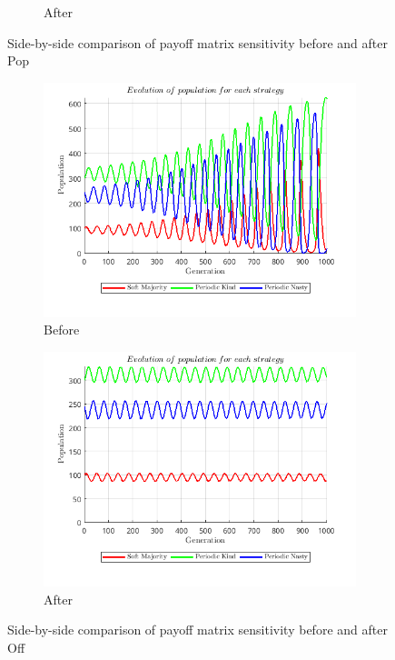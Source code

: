 \documentclass[12pt]{report}
\begin{document}
\begin{figure}[H]
\begin{subfigure}[t]{0.45\textwidth}
        \caption{After}
    \end{subfigure}
    \caption{Side-by-side comparison of payoff matrix sensitivity before and after Pop}
\end{figure}

\begin{figure}[H]
    \centering
    \begin{subfigure}[t]{0.45\textwidth}
        \centering
        \includegraphics[width=\textwidth]{payoff_matrix_sensitivity_before_off.png}
        \caption{Before}
    \end{subfigure}
    \hfill
    \begin{subfigure}[t]{0.45\textwidth}
        \centering
        \includegraphics[width=\textwidth]{payoff_matrix_sensitivity_after_off.png}
        \caption{After}
    \end{subfigure}
    \caption{Side-by-side comparison of payoff matrix sensitivity before and after Off}
\end{figure}
\end{document}

